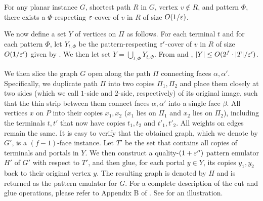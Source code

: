 \begin{lemma}
\label{lem: pattern cover}
For any planar instance $G$, shortest path $R$ in $G$, vertex $v\notin R$, and pattern $\Phi$, there exists a $\Phi$-respecting ${\varepsilon}$-cover of $v$ in $R$ of size $O(1/{\varepsilon})$.
\end{lemma}


We now define a set $Y$ of vertices on $\Pi$ as follows. For each terminal $t$ and for each pattern $\Phi$, let $Y_{t,\Phi}$ be the pattern-respecting ${\varepsilon}'$-cover of $v$ in $R$ of size $O(1/{\varepsilon}')$ given by . We then let set $Y=\bigcup_{t,\Phi}Y_{t,\Phi}$.
From  and , 
$|Y|\le O(2^f\cdot |T|/{\varepsilon}')$.





We then slice the graph $G$ open along the path $\Pi$ connecting faces $\alpha,\alpha'$.
Specifically, we duplicate path $\Pi$ into two copies $\Pi_1,\Pi_2$ and place them closely at two sides (which we call $1$-side and $2$-side, respectively) of its original image, such that the thin strip between them connect faces $\alpha,\alpha'$ into a single face $\beta$.
All vertices $x$ on $P$ into their copies $x_1,x_2$ ($x_1$ lies on $\Pi_1$ and $x_2$ lies on $\Pi_2$), including the terminals $t,t'$ that now have copies $t_1,t_2$ and $t'_1,t'_2$. All weights on edges remain the same. 
It is easy to verify that the obtained graph, which we denote by $G'$, is a $(f-1)$-face instance.
Let $T'$ be the set that contains all copies of terminals and portals in $Y$.
We then construct a quality-$(1+{\varepsilon}'')$ pattern emulator $H'$ of $G'$ with respect to $T'$, and then glue, for each portal $y\in Y$, its copies $y_1,y_2$ back to their original vertex $y$. The resulting graph is denoted by $H$ and is returned as the pattern emulator for $G$.
For a complete description of the cut and glue operations, please refer to Appendix B of \cite{chang2022near}.
See  for an illustration.

